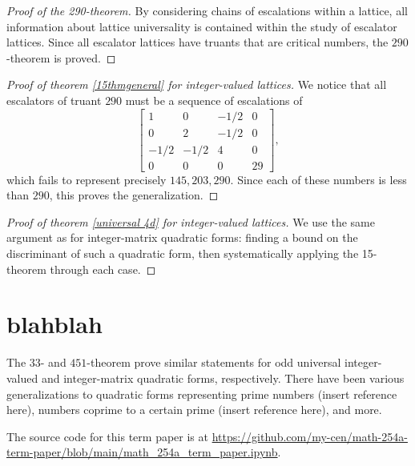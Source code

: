 \documentclass{article}
\begin{document}
\begin{proof}[Proof of the 290-theorem]
    By considering chains of escalations within a lattice, all information about lattice universality is contained within the study of escalator lattices. Since all escalator lattices have truants that are critical numbers, the $290$-theorem is proved.
\end{proof}

\begin{proof}[Proof of theorem \ref{15thmgeneral} for integer-valued lattices]
    We notice that all escalators of truant $290$ must be a sequence of escalations of
    \[\begin{bmatrix}
    1 & 0 & -1/2 & 0 \\
    0 & 2 & -1/2 & 0 \\
    -1/2 & -1/2 & 4 & 0 \\
    0 & 0 & 0 & 29
    \end{bmatrix},\]
    which fails to represent precisely $145, 203, 290$. Since each of these numbers is less than $290$, this proves the generalization.
\end{proof}

\begin{proof}[Proof of theorem \ref{universal 4d} for integer-valued lattices]
    We use the same argument as for integer-matrix quadratic forms: finding a bound on the discriminant of such a quadratic form, then systematically applying the 15-theorem through each case.
\end{proof}

\section{blahblah}

The $33$- and $451$-theorem prove similar statements for odd universal integer-valued and integer-matrix quadratic forms, respectively. There have been various generalizations to quadratic forms representing prime numbers (insert reference here), numbers coprime to a certain prime (insert reference here), and more.

The source code for this term paper is at \url{https://github.com/my-cen/math-254a-term-paper/blob/main/math_254a_term_paper.ipynb}.

\printbibliography
\end{document}

